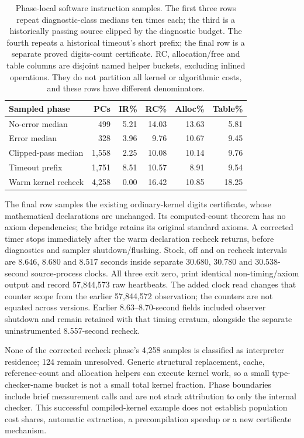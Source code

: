 \documentclass[10pt,twocolumn]{article}
\begin{document}
\begin{table}[t]
\centering
\small
\setlength{\tabcolsep}{3pt}
\begin{tabular}{lrrrrr}
\toprule
Sampled phase & PCs & IR\% & RC\% & Alloc\% & Table\% \\
\midrule
No-error median & 499 & 5.21 & 14.03 & 13.63 & 5.81 \\
Error median & 328 & 3.96 & 9.76 & 10.67 & 9.45 \\
Clipped-pass median & 1,558 & 2.25 & 10.08 & 10.14 & 9.76 \\
Timeout prefix & 1,751 & 8.51 & 10.57 & 8.91 & 9.54 \\
Warm kernel recheck & 4,258 & 0.00 & 16.42 & 10.85 & 18.25 \\
\bottomrule
\end{tabular}
\caption{Phase-local software instruction samples. The first three rows
repeat diagnostic-class medians ten times each; the third is a historically
passing source clipped by the diagnostic budget. The fourth repeats a
historical timeout's short prefix; the final row is a separate proved
digits-count certificate. RC, allocation/free and table columns are disjoint
named helper buckets, excluding inlined operations. They do not partition
all kernel or algorithmic costs, and these rows have different denominators.}
\label{tab:software-residence}
\end{table}

The final row samples the existing ordinary-kernel digits certificate,
whose mathematical declarations are unchanged. Its computed-count theorem
has no axiom dependencies; the bridge retains its original standard axioms.
A corrected timer stops immediately after the warm declaration recheck
returns, before diagnostics and sampler shutdown/flushing. Stock, off and
on recheck intervals are 8.646, 8.680 and 8.517 seconds inside separate
30.680, 30.780 and 30.538-second source-process clocks. All three exit zero,
print identical non-timing/axiom output and record 57,844,573 raw heartbeats.
The added clock read changes that counter scope from the earlier
57,844,572 observation; the counters are not equated across versions.
Earlier 8.63--8.70-second fields included observer shutdown and remain
retained with that timing erratum, alongside the separate uninstrumented
8.557-second recheck.

None of the corrected recheck phase's 4,258 samples is classified as
interpreter residence; 124 remain unresolved. Generic structural replacement,
cache, reference-count and allocation helpers can execute kernel work,
so a small type-checker-name bucket is not a small total kernel fraction.
Phase boundaries include brief measurement calls and are not stack attribution
to only the internal checker. This successful compiled-kernel example does
not establish population cost shares, automatic extraction, a precompilation
speedup or a new certificate mechanism.
\end{document}
